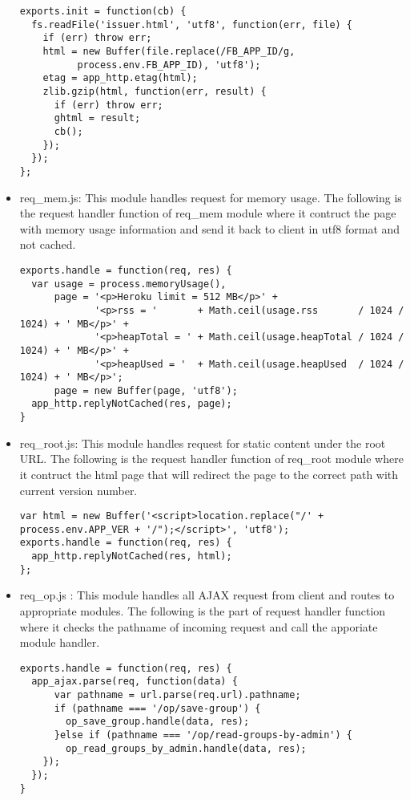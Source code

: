 \begin{itemize}
\begin{lstlisting} 
exports.init = function(cb) {
  fs.readFile('issuer.html', 'utf8', function(err, file) {
    if (err) throw err;
    html = new Buffer(file.replace(/FB_APP_ID/g, 
          process.env.FB_APP_ID), 'utf8');
    etag = app_http.etag(html);
    zlib.gzip(html, function(err, result) {
      if (err) throw err;
      ghtml = result;
      cb();
    });
  });
};
\end{lstlisting} 

\item req{\_}mem.js: This module handles request for memory usage. The following is the request handler function of req{\_}mem module where it contruct the page with memory usage information and send it back to client in utf8 format and not cached. 

\begin{lstlisting}
exports.handle = function(req, res) {
  var usage = process.memoryUsage(),
      page = '<p>Heroku limit = 512 MB</p>' + 
             '<p>rss = '       + Math.ceil(usage.rss       / 1024 / 1024) + ' MB</p>' +  
             '<p>heapTotal = ' + Math.ceil(usage.heapTotal / 1024 / 1024) + ' MB</p>' +
             '<p>heapUsed = '  + Math.ceil(usage.heapUsed  / 1024 / 1024) + ' MB</p>';
      page = new Buffer(page, 'utf8');
  app_http.replyNotCached(res, page);
}
\end{lstlisting}

\item req{\_}root.js: This module handles request for static content under the root URL. The following is the request handler function of req{\_}root module where it contruct the html page that will redirect the page to the correct path with current version number.

\begin{lstlisting}
var html = new Buffer('<script>location.replace("/' + process.env.APP_VER + '/");</script>', 'utf8');
exports.handle = function(req, res) {
  app_http.replyNotCached(res, html);
};
\end{lstlisting}


\item req{\_}op.js : This module handles all AJAX request from client and routes to appropriate modules. The following is the part of request handler function where it checks the pathname of incoming request and call the apporiate module handler.

\begin{lstlisting}
exports.handle = function(req, res) {
  app_ajax.parse(req, function(data) {
      var pathname = url.parse(req.url).pathname;
      if (pathname === '/op/save-group') {
        op_save_group.handle(data, res);
      }else if (pathname === '/op/read-groups-by-admin') {
        op_read_groups_by_admin.handle(data, res);
    });
  });
}
\end{lstlisting}
 
\end{itemize}

